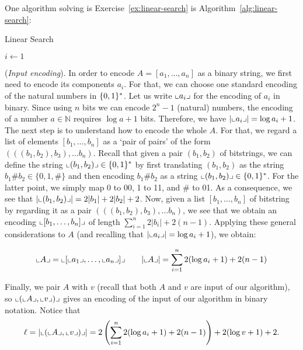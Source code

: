 \begin{solution}

	One algorithm solving is Exercise~\ref{ex:linear-search} is Algorithm~\ref{alg:linear-search}:

	\begin{algorithm}
		\caption{Linear Search}\label{alg:linear-search}
		$i \gets 1$\;
		\;
	\end{algorithm}
\end{solution}
(\emph{Input encoding}). In order to encode $A = [a_1,\ldots,a_n]$ as a binary string, we first need to encode its components $a_i$. For that, we can choose one standard encoding of the natural numbers in $\{ 0,1 \}^* $. Let us write $\llcorner a_i \lrcorner$ for the encoding of $a_i$ in binary. Since using $n$ bits we can encode $2^n - 1$ (natural) numbers, the encoding of a number $a \in \mathbb{N}$ requires $\log a + 1$ bits. Therefore, we have $|\llcorner a_i \lrcorner| = \log a_i + 1$. The next step is to understand how to encode the whole $A$. For that, we regard a list of elements $[b_1,\ldots,b_n]$ as a `pair of pairs' of the form $(((b_1,b_2),b_3),\ldots b_n)$. Recall that given a pair $(b_1,b_2)$ of bitstrings, we can define the string $\llcorner (b_1,b_2) \lrcorner \in \{ 0,1 \}^* $ by first translating $(b_1,b_2)$ as the string $b_1\#b_2 \in \{0,1,\#\}$ and then encoding $b_1\#b_2$ as a string $\llcorner (b_1,b_2) \lrcorner \in \{ 0,1 \}^* $. For the latter point, we simply map 0 to 00, 1 to 11, and \# to 01. As a consequence, we see that $|\llcorner (b_1,b_2) \lrcorner| = 2|b_1| + 2|b_2| + 2$. Now, given a list $[b_1,\ldots,b_n]$ of bitstring by regarding it as a pair $(((b_1,b_2),b_3),\ldots b_n)$, we see that we obtain an encoding $\llcorner [b_1,\ldots,b_n] \lrcorner$ of length $\sum_{i=1}^n 2|b_i|+2(n-1)$. Applying these general considerations to $A$ (and recalling that $|\llcorner a_i \lrcorner| = \log a_i + 1$), we obtain:

\[
	\llcorner A \lrcorner = \llcorner [\llcorner a_1 \lrcorner,\ldots,\llcorner a_n \lrcorner] \lrcorner \qquad |\llcorner A \lrcorner| = \sum_{i=1}^n 2(\log a_i + 1) + 2(n-1)
\]

Finally, we pair $A$ with $v$ (recall that both $A$ and $v$ are input of our algorithm), so $\llcorner (\llcorner A \lrcorner,\llcorner v \lrcorner) \lrcorner$ gives an encoding of the input of our algorithm in binary notation. Notice that
\[
	\ell = |\llcorner (\llcorner A \lrcorner,\llcorner v \lrcorner) \lrcorner| = 2\left(\sum_{i=1}^n 2(\log a_i + 1) + 2(n-1)\right) + 2(\log v + 1) + 2.
\]

